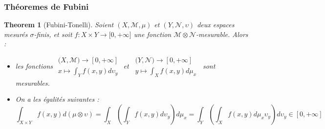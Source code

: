 \documentclass[3pt]{article}
\newtheorem{theorem}{Theorem}
\begin{document}
\subsubsection{Th\'{e}oremes de Fubini}

\bigskip 

\begin{theorem}[Fubini-Tonelli]
Soient $(X,\mathcal{M},\mu )$ et $(Y,\mathcal{N},\upsilon )$ deux espaces
mesur\'{e}s $\sigma $-finis, et soit $f:X\times Y\rightarrow \lbrack
0,+\infty ]$ une fonction $\mathcal{M}\otimes \mathcal{N}$-mesurable. Alors :

\begin{itemize}
\item les fonctions $%
\begin{array}{c}
(X,\mathcal{M)\rightarrow }\left[ 0,+\infty \right]  \\ 
x\mapsto \int_{Y}f(x,y)d\upsilon _{y}%
\end{array}%
$ et\ $%
\begin{array}{c}
(Y,\mathcal{N)\rightarrow }\left[ 0,+\infty \right]  \\ 
y\mapsto \int_{X}f(x,y)d\mu _{x}%
\end{array}%
$\ sont mesurables.

\item On a les \'{e}galit\'{e}s suivantes :%
\begin{equation*}
\int_{X\times Y}f(x,y)d(\mu \otimes \upsilon )=\int_{X}\left(
\int_{Y}f(x,y)d\upsilon _{y}\right) d\mu _{x}=\int_{Y}\left(
\int_{X}f(x,y)d\mu _{x}\upsilon _{y}\right) d\upsilon _{y}\in \left[
0,+\infty \right] 
\end{equation*}
\end{itemize}
\end{theorem}

\bigskip 
\end{document}

